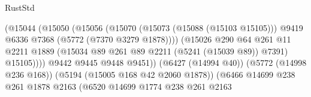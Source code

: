 \begin{lexlean}{RustStd}
\begin{coremodule}
                                                  (@15044
                                                    (@15050
                                                      (@15056
                                                        (@15070
                                                          (@15073 (@15088 (@15103 @15105)))
                                                          @9419
                                                          @6336
                                                          @7368
                                                          (@5772 (@7370 @3279 @1878))))
                                                      (@15026
                                                        @290
                                                        @64
                                                        @261
                                                        @11
                                                        @2211
                                                        @1889
                                                        (@15034
                                                          @89
                                                          @261
                                                          @89
                                                          @2211
                                                          (@5241 (@15039 @89))
                                                          @7391)
                                                        @15105))))
                                                @9442
                                                @9445
                                                @9448
                                                @9451))
                                            (@6427 (@14994 @40))
                                            (@5772 (@14998 @236 @168))
                                            (@5194 (@15005 @168 @42 @2060 @1878))
                                            (@6466
                                              @14699
                                              @238
                                              @261
                                              @1878
                                              @2163
                                              (@6520
                                                @14699
                                                @1774
                                                @238
                                                @261
                                                @2163

\end{coremodule}
\end{lexlean}
